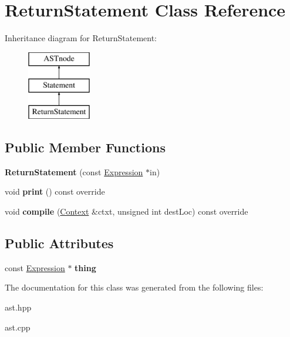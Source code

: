 \hypertarget{class_return_statement}{}\section{Return\+Statement Class Reference}
\label{class_return_statement}
Inheritance diagram for Return\+Statement\+:\begin{figure}[H]
\begin{center}
\leavevmode
\includegraphics[height=3.000000cm]{class_return_statement}
\end{center}
\end{figure}
\subsection*{Public Member Functions}
\begin{DoxyCompactItemize}
\item 
\mbox{\label{class_return_statement_afa9044bef48163f409d0910cab7aad21}} 
{\bfseries Return\+Statement} (const \hyperlink{class_expression}{Expression} $\ast$in)
\item 
\mbox{\label{class_return_statement_a90e892fc6a685a31f3251946ab02348b}} 
void {\bfseries print} () const override
\item 
\mbox{\label{class_return_statement_aad7f97ab1984c0da326157d6b06b162f}} 
void {\bfseries compile} (\hyperlink{class_context}{Context} \&ctxt, unsigned int dest\+Loc) const override
\end{DoxyCompactItemize}
\subsection*{Public Attributes}
\begin{DoxyCompactItemize}
\item 
\mbox{\label{class_return_statement_a1ecfd5e94a511544e9dd4fbdfa81ea4a}} 
const \hyperlink{class_expression}{Expression} $\ast$ {\bfseries thing}
\end{DoxyCompactItemize}


The documentation for this class was generated from the following files\+:\begin{DoxyCompactItemize}
\item 
ast.\+hpp\item 
ast.\+cpp\end{DoxyCompactItemize}

